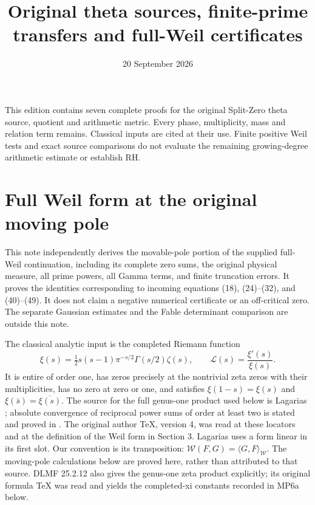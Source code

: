 \documentclass[11pt]{article}
\title{Original theta sources, finite-prime transfers and full-Weil certificates}
\author{}\date{20 September 2026}
\begin{document}
\maketitle
This edition contains seven complete proofs for the original Split-Zero
theta source, quotient and arithmetic metric. Every phase, multiplicity,
mass and relation term remains. Classical inputs are cited at their use.
Finite positive Weil tests and exact source comparisons do not evaluate
the remaining growing-degree arithmetic estimate or establish RH.


\clearpage\begingroup
\part*{Full Weil form at the original moving pole}
\newtheorem{swpoletheorem}{Theorem}
\newtheorem{swpolelemma}[swpoletheorem]{Lemma}
\newcommand{\swpoleW}{\mathcal W}
\newcommand{\swpoleLL}{\mathscr L}
\newcommand{\swpoledd}{\,\mathrm d}
\newcommand{\swpoleRea}{\operatorname{Re}}
\newcommand{\swpoleIma}{\operatorname{Im}}
\newcommand{\swpolevM}{\Lambda_{\mathrm{vM}}}



This note independently derives the movable-pole portion of the supplied
full-Weil continuation, including its complete zero sums, the original
physical measure, all prime powers, all Gamma terms, and finite truncation
errors. It proves the identities corresponding to incoming equations
(18), (24)--(32), and (40)--(49). It does not claim a negative numerical
certificate or an off-critical zero. The separate Gaussian estimates and
the Fable determinant comparison are outside this note.

The classical analytic input is the completed Riemann function
\begin{equation}
 \xi(s)=\tfrac12s(s-1)\pi^{-s/2}\Gamma(s/2)\zeta(s),\qquad
 \swpoleLL(s)=\frac{\xi'(s)}{\xi(s)}.\tag{MP1}
\end{equation}
It is entire of order one, has zeros precisely at the nontrivial zeta zeros
with their multiplicities, has no zero at zero or one, and satisfies
$\xi(1-s)=\xi(s)$ and $\xi(\bar s)=\overline{\xi(s)}$.
The source for the full genus-one product used below is Lagarias
\cite[Lemma 4.1 and its proof]{swpole:Lagarias}; absolute convergence of reciprocal
power sums of order at least two is stated and proved in
\cite[Lemma 2.1]{swpole:Lagarias}. The original author TeX, version 4, was read at
these locators and at the definition of the Weil form in Section 3.
Lagarias uses a form linear in its first slot. Our convention is its
transposition: $\swpoleW(F,G)=\langle G,F\rangle_{\mathcal W}$.
The moving-pole calculations below are proved here, rather than attributed
to that source. DLMF 25.2.12 \cite{swpole:DLMFProduct} also gives the
genus-one zeta product explicitly; its original formula TeX was read
and yields the completed-xi constants recorded in MP6a below.
\end{document}
